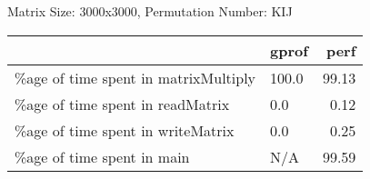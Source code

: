 \documentclass{article}
\begin{document}
    Matrix Size: 3000x3000, Permutation Number: KIJ \\
    \begin{tabular}{llr}
\hline
                                      & gprof   &   perf \\
\hline
 \%age of time spent in matrixMultiply & 100.0   &  99.13 \\
 \%age of time spent in readMatrix     & 0.0     &   0.12 \\
 \%age of time spent in writeMatrix    & 0.0     &   0.25 \\
 \%age of time spent in main           & N/A     &  99.59 \\
\hline
\end{tabular}
    
\end{document}
